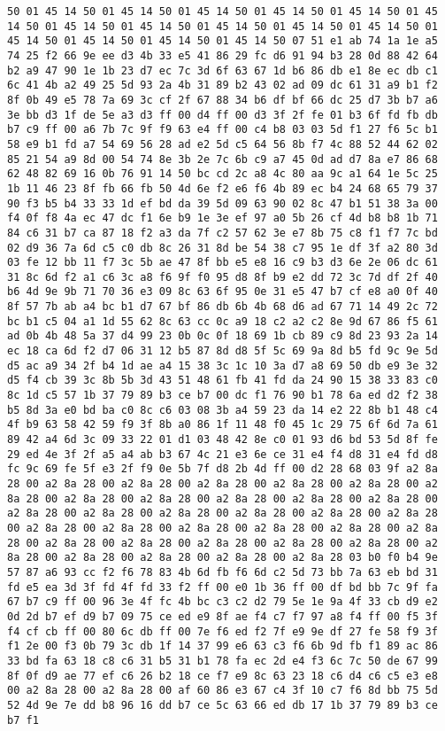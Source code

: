 \documentclass{article}
\begin{document}
\begin{verbatim}
50 01 45 14 50 01 45 14 50 01 45 14 50 01 45 14 50 01 45 14 50 01 45 14 50 01 45 14 50 01 45 14 50 01 45 14 50 01 45 14 50 01 45 14 50 01 45 14 50 01 45 14 50 01 45 14 50 01 45 14 50 07 51 e1 ab 74 1a 1e a5 74 25 f2 66 9e ee d3 4b 33 e5 41 86 29 fc d6 91 94 b3 28 0d 88 42 64 b2 a9 47 90 1e 1b 23 d7 ec 7c 3d 6f 63 67 1d b6 86 db e1 8e ec db c1 6c 41 4b a2 49 25 5d 93 2a 4b 31 89 b2 43 02 ad 09 dc 61 31 a9 b1 f2 8f 0b 49 e5 78 7a 69 3c cf 2f 67 88 34 b6 df bf 66 dc 25 d7 3b b7 a6 3e bb d3 1f de 5e a3 d3 ff 00 d4 ff 00 d3 3f 2f fe 01 b3 6f fd fb db b7 c9 ff 00 a6 7b 7c 9f f9 63 e4 ff 00 c4 b8 03 03 5d f1 27 f6 5c b1 58 e9 b1 fd a7 54 69 56 28 ad e2 5d c5 64 56 8b f7 4c 88 52 44 62 02 85 21 54 a9 8d 00 54 74 8e 3b 2e 7c 6b c9 a7 45 0d ad d7 8a e7 86 68 62 48 82 69 16 0b 76 91 14 50 bc cd 2c a8 4c 80 aa 9c a1 64 1e 5c 25 1b 11 46 23 8f fb 66 fb 50 4d 6e f2 e6 f6 4b 89 ec b4 24 68 65 79 37 90 f3 b5 b4 33 33 1d ef bd da 39 5d 09 63 90 02 8c 47 b1 51 38 3a 00 f4 0f f8 4a ec 47 dc f1 6e b9 1e 3e ef 97 a0 5b 26 cf 4d b8 b8 1b 71 84 c6 31 b7 ca 87 18 f2 a3 da 7f c2 57 62 3e e7 8b 75 c8 f1 f7 7c bd 02 d9 36 7a 6d c5 c0 db 8c 26 31 8d be 54 38 c7 95 1e df 3f a2 80 3d 03 fe 12 bb 11 f7 3c 5b ae 47 8f bb e5 e8 16 c9 b3 d3 6e 2e 06 dc 61 31 8c 6d f2 a1 c6 3c a8 f6 9f f0 95 d8 8f b9 e2 dd 72 3c 7d df 2f 40 b6 4d 9e 9b 71 70 36 e3 09 8c 63 6f 95 0e 31 e5 47 b7 cf e8 a0 0f 40 8f 57 7b ab a4 bc b1 d7 67 bf 86 db 6b 4b 68 d6 ad 67 71 14 49 2c 72 bc b1 c5 04 a1 1d 55 62 8c 63 cc 0c a9 18 c2 a2 c2 8e 9d 67 86 f5 61 ad 0b 4b 48 5a 37 d4 99 23 0b 0c 0f 18 69 1b cb 89 c9 8d 23 93 2a 14 ec 18 ca 6d f2 d7 06 31 12 b5 87 8d d8 5f 5c 69 9a 8d b5 fd 9c 9e 5d d5 ac a9 34 2f b4 1d ae a4 15 38 3c 1c 10 3a d7 a8 69 50 db e9 3e 32 d5 f4 cb 39 3c 8b 5b 3d 43 51 48 61 fb 41 fd da 24 90 15 38 33 83 c0 8c 1d c5 57 1b 37 79 89 b3 ce b7 00 dc f1 76 90 b1 78 6a ed d2 f2 38 b5 8d 3a e0 bd ba c0 8c c6 03 08 3b a4 59 23 da 14 e2 22 8b b1 48 c4 4f b9 63 58 42 59 f9 3f 8b a0 86 1f 11 48 f0 45 1c 29 75 6f 6d 7a 61 89 42 a4 6d 3c 09 33 22 01 d1 03 48 42 8e c0 01 93 d6 bd 53 5d 8f fe 29 ed 4e 3f 2f a5 a4 ab b3 67 4c 21 e3 6e ce 31 e4 f4 d8 31 e4 fd d8 fc 9c 69 fe 5f e3 2f f9 0e 5b 7f d8 2b 4d ff 00 d2 28 68 03 9f a2 8a 28 00 a2 8a 28 00 a2 8a 28 00 a2 8a 28 00 a2 8a 28 00 a2 8a 28 00 a2 8a 28 00 a2 8a 28 00 a2 8a 28 00 a2 8a 28 00 a2 8a 28 00 a2 8a 28 00 a2 8a 28 00 a2 8a 28 00 a2 8a 28 00 a2 8a 28 00 a2 8a 28 00 a2 8a 28 00 a2 8a 28 00 a2 8a 28 00 a2 8a 28 00 a2 8a 28 00 a2 8a 28 00 a2 8a 28 00 a2 8a 28 00 a2 8a 28 00 a2 8a 28 00 a2 8a 28 00 a2 8a 28 00 a2 8a 28 00 a2 8a 28 00 a2 8a 28 00 a2 8a 28 00 a2 8a 28 03 b0 f0 b4 9e 57 87 a6 93 cc f2 f6 78 83 4b 6d fb f6 6d c2 5d 73 bb 7a 63 eb bd 31 fd e5 ea 3d 3f fd 4f fd 33 f2 ff 00 e0 1b 36 ff 00 df bd bb 7c 9f fa 67 b7 c9 ff 00 96 3e 4f fc 4b bc c3 c2 d2 79 5e 1e 9a 4f 33 cb d9 e2 0d 2d b7 ef d9 b7 09 75 ce ed e9 8f ae f4 c7 f7 97 a8 f4 ff 00 f5 3f f4 cf cb ff 00 80 6c db ff 00 7e f6 ed f2 7f e9 9e df 27 fe 58 f9 3f f1 2e 00 f3 0b 79 3c db 1f 14 37 99 e6 63 c3 f6 6b 9d fb f1 89 ac 86 33 bd fa 63 18 c8 c6 31 b5 31 b1 78 fa ec 2d e4 f3 6c 7c 50 de 67 99 8f 0f d9 ae 77 ef c6 26 b2 18 ce f7 e9 8c 63 23 18 c6 d4 c6 c5 e3 e8 00 a2 8a 28 00 a2 8a 28 00 af 60 86 e3 67 c4 3f 10 c7 f6 8d bb 75 5d 52 4d 9e 7e dd b8 96 16 dd b7 ce 5c 63 66 ed db 17 1b 37 79 89 b3 ce b7 f1 
\end{verbatim}
\end{document}
